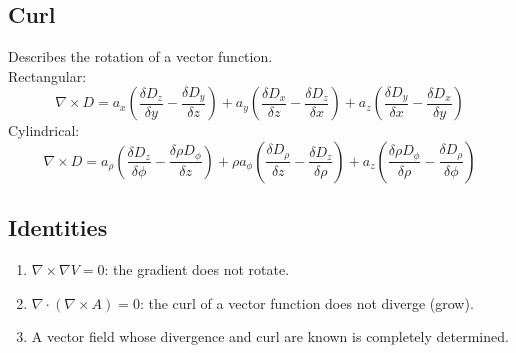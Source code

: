 \documentclass[nobib]{tufte-handout}
\begin{document}
\subsection{Curl}
Describes the rotation of a vector function.\\
Rectangular:
\begin{equation*}
    \nabla \times D = a_x\left(\frac{\delta D_z}{\delta y} - \frac{\delta D_y}{\delta z}\right)+ a_y\left(\frac{\delta D_x}{\delta z} - \frac{\delta D_z}{\delta x}\right)+ a_z\left(\frac{\delta D_y}{\delta x} - \frac{\delta D_x}{\delta y}\right)
\end{equation*}
Cylindrical:
\begin{equation*}
    \nabla \times D = a_\rho\left(\frac{\delta D_z}{\delta \phi} - \frac{\delta \rho D_\phi}{\delta z}\right)+ \rho a_\phi\left(\frac{\delta D_\rho}{\delta z} - \frac{\delta D_z}{\delta \rho}\right)+ a_z \left(\frac{\delta \rho D_\phi}{\delta \rho} - \frac{\delta D_\rho}{\delta \phi}\right)
\end{equation*}
\subsection{Identities}
\begin{enumerate}
    \item $\nabla \times \nabla V = 0$: the gradient does not rotate.
    \item $\nabla \cdot (\nabla \times A) = 0$: the curl of a vector function does not diverge (grow).
    \item A vector field whose divergence and curl are known is completely determined.
\end{enumerate}
\end{document}
